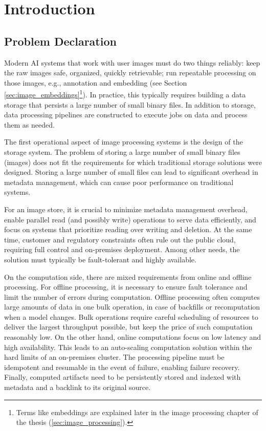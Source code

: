 \chapter{Introduction} \label{sec:introduction}
\section{Problem Declaration} \label{ch:problem_declaration}
Modern AI systems that work with user images must do two things reliably: keep the raw images safe, organized, quickly retrievable; run repeatable processing on those images, e.g., annotation and embedding (see Section \ref{sec:image_embeddings}\footnote{Terms like embeddings are explained later in the image processing chapter of the thesis (\ref{sec:image_processing}).}). In practice, this typically requires building a data storage that persists a large number of small binary files. In addition to storage, data processing pipelines are constructed to execute jobs on data and process them as needed.

The first operational aspect of image processing systems is the design of the storage system. The problem of storing a large number of small binary files (images) does not fit the requirements for which traditional storage solutions were designed. Storing a large number of small files can lead to significant overhead in metadata management, which can cause poor performance on traditional systems.\cite{beaver_finding_2010}

For an image store, it is crucial to minimize metadata management overhead, enable parallel read (and possibly write) operations to serve data efficiently, and focus on systems that prioritize reading over writing and deletion. At the same time, customer and regulatory constraints often rule out the public cloud, requiring full control and on-premises deployment. Among other needs, the solution must typically be fault-tolerant and highly available.

On the computation side, there are mixed requirements from online and offline processing. For offline processing, it is necessary to ensure fault tolerance and limit the number of errors during computation. Offline processing often computes large amounts of data in one bulk operation, in case of backfills or recomputation when a model changes. Bulk operations require careful scheduling of resources to deliver the largest throughput possible, but keep the price of such computation reasonably low. On the other hand, online computations focus on low latency and high availability. This leads to an auto-scaling computation solution within the hard limits of an on-premises cluster. The processing pipeline must be idempotent and resumable in the event of failure, enabling failure recovery. Finally, computed artifacts need to be persistently stored and indexed with metadata and a backlink to its original source.

